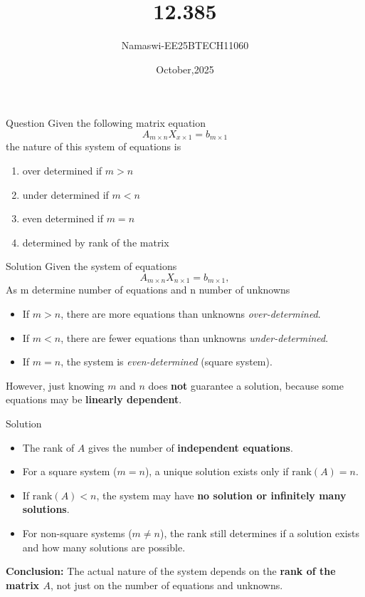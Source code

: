\documentclass{beamer}
\begin{document}
\title 
{12.385}
\date{October,2025}


\author 
{Namaswi-EE25BTECH11060}
\frame{\titlepage}
\begin{frame}{Question}
Given the following matrix equation 
 \[
A_{m \times n} X_{x \times 1} = b_{m \times 1}
\]  the nature of this system of equations is \\
\begin{multicols}{2}
    \begin{enumerate}
\item  over determined if $m>n$
 \item  under determined if $m<n$
 \item  even determined if $m=n$
 \item  determined by rank of the matrix 
    \end{enumerate}
\end{multicols}
\end{frame}
\begin{frame}{Solution}
    Given the system of equations 
\[
A_{m \times n} X_{n \times 1} = b_{m \times 1},
\] 
As m determine number of equations and n number of unknowns\\ 
\begin{itemize}
    \item If $m > n$, there are more equations than unknowns   \textit{over-determined}.
    \item If $m < n$, there are fewer equations than unknowns   \textit{under-determined}.
    \item If $m = n$, the system is \textit{even-determined} (square system).
    \end{itemize}
However, just knowing $m$ and $n$ does \textbf{not} guarantee a solution, because some equations may be \textbf{linearly dependent}.
\end{frame}
\begin{frame}{Solution}
    \begin{itemize}
    \item The rank of $A$ gives the number of \textbf{independent equations}.
    \item For a square system ($m=n$), a unique solution exists only if $\text{rank}(A) = n$.
    \item If $\text{rank}(A) < n$, the system may have \textbf{no solution or infinitely many solutions}.
    \item For non-square systems ($m \neq n$), the rank still determines if a solution exists and how many solutions are possible.
\end{itemize}
\textbf{Conclusion:}  
The actual nature of the system depends on the \textbf{rank of the matrix $A$}, not just on the number of equations and unknowns.  
\end{frame}
\end{document}
